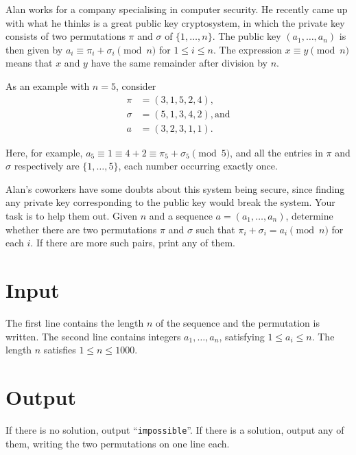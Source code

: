 
Alan works for a company specialising in computer security. He recently came up with what he
thinks is a great public key cryptosystem, in which the private key consists of two permutations
$\pi$ and $\sigma$ of $\{1, \dots, n\}$. The public key $(a_1, \dots, a_n)$ is then given by $a_i
\equiv \pi_i + \sigma_i \pmod{n}$ for $1 \leq i \leq n$. The expression $x \equiv y \pmod n$ means
that $x$ and $y$ have the same remainder after division by $n$.

As an example with $n = 5$, consider
\begin{align*}
\pi &= (3,1,5,2,4), \\
\sigma &= (5,1,3,4,2), \text{and} \\
a &= (3,2,3,1,1).
\end{align*}

Here, for example, $a_5 \equiv 1 \equiv 4 + 2 \equiv \pi_5 + \sigma_5 \pmod{5}$, and all the entries in $\pi$ and $\sigma$ respectively are $\{1, \dots, 5\}$, each number occurring exactly once.

Alan's coworkers have some doubts about this system being secure, since finding any private key corresponding to the public key would break the system. Your task is to help them out. Given $n$ and a sequence $a = (a_1, \dots, a_n)$, determine whether there are two permutations $\pi$ and $\sigma$ such that $\pi_i + \sigma_i = a_i \pmod{n}$ for each $i$. If there are more such pairs, print any of them.


\section*{Input}
The first line contains the length $n$ of the sequence and the permutation is written.
The second line contains integers $a_1, \dots, a_n$, satisfying $1 \leq a_i \leq n$. The length $n$ satisfies $1 \leq n \leq 1000$.

\section*{Output}
If there is no solution, output ``\texttt{impossible}''.
If there is a solution, output any of them, writing the two permutations on one line each.
